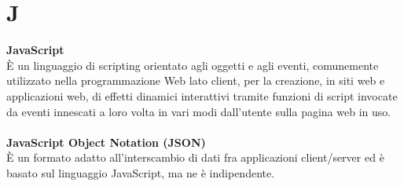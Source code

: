 \section{J}
\textbf{JavaScript}\\
È un linguaggio di scripting orientato agli oggetti e agli eventi, comunemente utilizzato nella programmazione Web lato client, per la creazione, in siti web e applicazioni web, di effetti dinamici interattivi tramite funzioni di script invocate da eventi innescati a loro volta in vari modi dall'utente sulla pagina web in uso. \\ \\
\textbf{JavaScript Object Notation (JSON)}\\
È un formato adatto all'interscambio di dati fra applicazioni client/server ed è basato sul linguaggio JavaScript, ma ne è indipendente. \\ \\
\clearpage